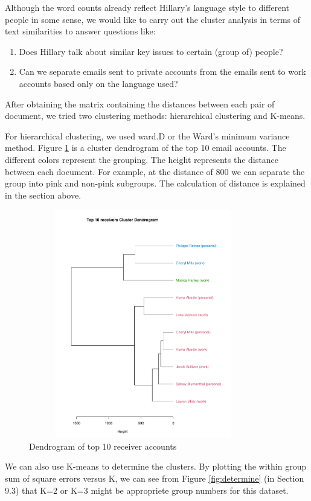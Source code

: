 Although the word counts already reflect Hillary's language style to different people in some sense, we would like to carry out the cluster analysis in terms of text similarities to answer questions like: 
\begin{enumerate}
  \item Does Hillary talk about similar key issues to certain (group of) people?
  \item Can we separate emails sent to private accounts from the emails sent to work accounts based only on the language used?
\end{enumerate}

After obtaining the matrix containing the distances between each pair of document, we tried two clustering methods: hierarchical clustering and K-means. 

For hierarchical clustering, we used ward.D or the Ward's minimum variance method. Figure \ref{fig:dendr} is a cluster dendrogram of the top 10 email accounts. The different colors represent the grouping. The height represents the distance between each document. For example, at the distance of 800 we can separate the group into pink and non-pink subgroups. The calculation of distance is explained in the section above.
\begin{figure}[h!]
    \centering
    \includegraphics[width=10cm,height=10cm]
    {daitong_and_yihe/clusterp.pdf}
    \caption{Dendrogram of top 10 receiver accounts}
    \label{fig:dendr}
\end{figure}

We can also use K-means to determine the clusters. By plotting the within group sum of square errors versus K, we can see from Figure \ref{fig:determine} (in Section 9.3) that K=2 or K=3 might be appropriete group numbers for this dataset.

